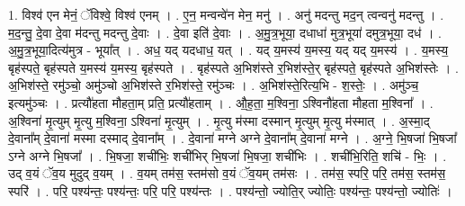 \documentclass[17pt]{extarticle}
\begin{document}
1. विश्व॑ एन मेनं॒ ॅविश्वे॒ विश्व॑ एनम् । . ए॒न॒ मन्वन्वे॑न मेन॒ मनु॑ । . अनु॑ मदन्तु मद॒न् त्वन्वनु॑ मदन्तु । . म॒द॒न्तु॒ दे॒वा दे॒वा म॑दन्तु मदन्तु दे॒वाः । . दे॒वा इति॑ दे॒वाः । . अ॒मु॒त्र॒भूया॒ दधाधा॑ मुत्र॒भूया॑ दमुत्र॒भूया॒ दध॑ । . अ॒मु॒त्र॒भूया॒दित्य॑मुत्र - भूया᳚त् । . अध॒ यद् यदधाध॒ यत् । . यद् य॒मस्य॑ य॒मस्य॒ यद् यद् य॒मस्य॑ । . य॒मस्य॒ बृह॑स्पते॒ बृह॑स्पते य॒मस्य॑ य॒मस्य॒ बृह॑स्पते । . बृह॑स्पते अ॒भिश॑स्ते र॒भिश॑स्ते॒र् बृह॑स्पते॒ बृह॑स्पते अ॒भिश॑स्तेः । . अ॒भिश॑स्ते॒ रमु॑ञ्चो॒ अमु॑ञ्चो अ॒भिश॑स्ते र॒भिश॑स्ते॒ रमु॑ञ्चः । . अ॒भिश॑स्ते॒रित्य॒भि - श॒स्तेः॒ । . अमु॑ञ्च॒ इत्यमु॑ञ्चः । . प्रत्यौ॑हता मौहता॒म् प्रति॒ प्रत्यौ॑हताम् । . औ॒ह॒ता॒ म॒श्विना॒ ऽश्विनौ॑हता मौहता म॒श्विना᳚ । . अ॒श्विना॑ मृ॒त्युम् मृ॒त्यु म॒श्विना॒ ऽश्विना॑ मृ॒त्युम् । . मृ॒त्यु म॑स्मा दस्मान् मृ॒त्युम् मृ॒त्यु म॑स्मात् । . अ॒स्मा॒द् दे॒वाना᳚म् दे॒वाना॑ मस्मा दस्माद् दे॒वाना᳚म् । . दे॒वाना॑ मग्ने अग्ने दे॒वाना᳚म् दे॒वाना॑ मग्ने । . अ॒ग्ने॒ भि॒षजा॑ भि॒षजा᳚ ऽग्ने अग्ने भि॒षजा᳚ । . भि॒षजा॒ शची॑भिः॒ शची॑भिर् भि॒षजा॑ भि॒षजा॒ शची॑भिः । . शची॑भि॒रिति॒ शचि॑ - भिः॒ । . उद् व॒यं ॅव॒य मुदुद् व॒यम् । . व॒यम् तम॑स॒ स्तम॑सो व॒यं ॅव॒यम् तम॑सः । . तम॑स॒ स्परि॒ परि॒ तम॑स॒ स्तम॑स॒ स्परि॑ । . परि॒ पश्य॑न्तः॒ पश्य॑न्तः॒ परि॒ परि॒ पश्य॑न्तः । . पश्य॑न्तो॒ ज्योति॒र् ज्योतिः॒ पश्य॑न्तः॒ पश्य॑न्तो॒ ज्योतिः॑ । \newline
\end{document}
